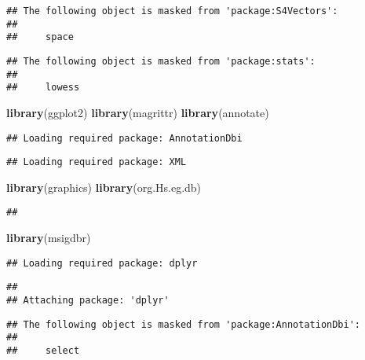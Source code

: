 \documentclass[]{article}
\newenvironment{Shaded}{\begin{snugshade}}{\end{snugshade}}
\newcommand{\KeywordTok}[1]{\textcolor[rgb]{0.13,0.29,0.53}{\textbf{#1}}}
\newcommand{\NormalTok}[1]{#1}
\begin{document}
\begin{verbatim}
## The following object is masked from 'package:S4Vectors':
## 
##     space
\end{verbatim}

\begin{verbatim}
## The following object is masked from 'package:stats':
## 
##     lowess
\end{verbatim}

\begin{Shaded}
\begin{Highlighting}[]
\KeywordTok{library}\NormalTok{(ggplot2)}
\KeywordTok{library}\NormalTok{(magrittr)}
\KeywordTok{library}\NormalTok{(annotate)}
\end{Highlighting}
\end{Shaded}

\begin{verbatim}
## Loading required package: AnnotationDbi
\end{verbatim}

\begin{verbatim}
## Loading required package: XML
\end{verbatim}

\begin{Shaded}
\begin{Highlighting}[]
\KeywordTok{library}\NormalTok{(graphics)}
\KeywordTok{library}\NormalTok{(org.Hs.eg.db)}
\end{Highlighting}
\end{Shaded}

\begin{verbatim}
## 
\end{verbatim}

\begin{Shaded}
\begin{Highlighting}[]
\KeywordTok{library}\NormalTok{(msigdbr)}
\end{Highlighting}
\end{Shaded}

\begin{verbatim}
## Loading required package: dplyr
\end{verbatim}

\begin{verbatim}
## 
## Attaching package: 'dplyr'
\end{verbatim}

\begin{verbatim}
## The following object is masked from 'package:AnnotationDbi':
## 
##     select
\end{verbatim}
\end{document}
